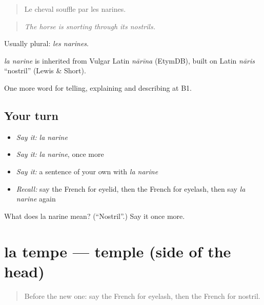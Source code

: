 \begin{quote}
Le cheval souffle par les narines.
\end{quote}

\begin{quote}
\emph{The horse is snorting through its nostrils.}
\end{quote}

Usually plural: \emph{les narines}.

\begin{cousinweb}
\emph{la narine} is inherited from Vulgar Latin \emph{nārīna} (EtymDB), built on Latin \emph{nāris} \textquotedblleft{}nostril\textquotedblright{} (Lewis \& Short).
\end{cousinweb}

\begin{grammarlens}[title={What you've built}]
One more word for telling, explaining and describing at B1.
\end{grammarlens}

\subsection*{Your turn}
\begin{itemize}
\raggedright
  \item \emph{Say it:} \emph{la narine}
  \item \emph{Say it:} \emph{la narine}, once more
  \item \emph{Say it:} a sentence of your own with \emph{la narine}
  \item \emph{Recall:} say the French for eyelid, then the French for eyelash, then say \emph{la narine} again
\end{itemize}

\begin{tcolorbox}[breakable,colback=teal!4,colframe=teal!35!black,title={Before you move on}]
What does la narine mean? (\textquotedblleft{}Nostril\textquotedblright{}.) Say it once more.
\end{tcolorbox}
\section[la tempe]{la tempe — temple (side of the head)}

\label{lesson:FR-C478-tempe}



\begin{quote}
Before the new one: say the French for eyelash, then the French for nostril.
\end{quote}

